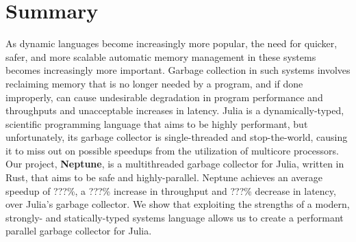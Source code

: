 \section{Summary} \label{summary}
As dynamic languages become increasingly more popular, the need for quicker, safer, and more scalable automatic memory management in these systems becomes increasingly more important.
Garbage collection in such systems involves reclaiming memory that is no longer needed by a program, and if done improperly, can cause undesirable degradation in program performance and throughputs and unacceptable increases in latency.
Julia is a dynamically-typed, scientific programming language that aims to be highly performant, but unfortunately, its garbage collector is single-threaded and stop-the-world, causing it to miss out on possible speedups from the utilization of multicore processors.
Our project, \textbf{Neptune}, is a multithreaded garbage collector for Julia, written in Rust, that aims to be safe and highly-parallel.
Neptune achieves an average speedup of ???\%, a ???\% increase in throughput and ???\% decrease in latency, over Julia's garbage collector.
We show that exploiting the strengths of a modern, strongly- and statically-typed systems language allows us to create a performant parallel garbage collector for Julia.
